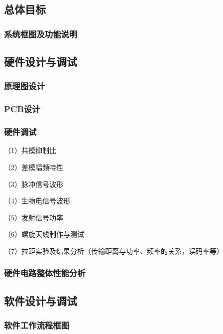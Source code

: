 \documentclass{zjureport}
\begin{document}
	\subsection{总体目标}
	
	
	
	\subsubsection{系统框图及功能说明}
	
	\subsection{硬件设计与调试}
	
	\subsubsection{原理图设计}
	
	\subsubsection{PCB设计}
	
	\subsubsection{硬件调试}
	
	（1）共模抑制比
	
	（2）差模幅频特性
	
	（3）脉冲信号波形
	
	（4）生物电信号波形
	
	（5）发射信号功率
	
	（6）螺旋天线制作与测试
	
	（7）拉距实验及结果分析（传输距离与功率、频率的关系，误码率等）
	
	\subsubsection{硬件电路整体性能分析}
	
	\subsection{软件设计与调试}
	
	\subsubsection{软件工作流程框图}
	
\end{document}
